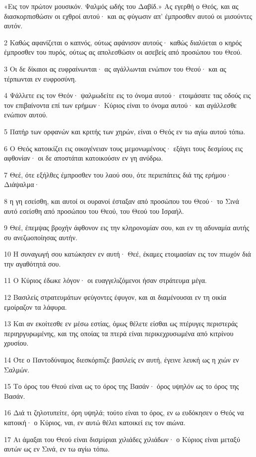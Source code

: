 \par «Εις τον πρώτον μουσικόν. Ψαλμός ωδής του Δαβίδ.» Ας εγερθή ο Θεός, και ας διασκορπισθώσιν οι εχθροί αυτού· και ας φύγωσιν απ' έμπροσθεν αυτού οι μισούντες αυτόν.
\par 2 Καθώς αφανίζεται ο καπνός, ούτως αφάνισον αυτούς· καθώς διαλύεται ο κηρός έμπροσθεν του πυρός, ούτως ας απολεσθώσιν οι ασεβείς από προσώπου του Θεού.
\par 3 Οι δε δίκαιοι ας ευφραίνωνται· ας αγάλλωνται ενώπιον του Θεού· και ας τέρπωνται εν ευφροσύνη.
\par 4 Ψάλλετε εις τον Θεόν· ψαλμωδείτε εις το όνομα αυτού· ετοιμάσατε τας οδούς εις τον επιβαίνοντα επί των ερήμων· Κύριος είναι το όνομα αυτού· και αγάλλεσθε ενώπιον αυτού.
\par 5 Πατήρ των ορφανών και κριτής των χηρών, είναι ο Θεός εν τω αγίω αυτού τόπω.
\par 6 Ο Θεός κατοικίζει εις οικογένειαν τους μεμονωμένους· εξάγει τους δεσμίους εις αφθονίαν· οι δε αποστάται κατοικούσιν εν γη ανύδρω.
\par 7 Θεέ, ότε εξήλθες έμπροσθεν του λαού σου, ότε περιεπάτεις διά της ερήμου· Διάψαλμα·
\par 8 η γη εσείσθη, και αυτοί οι ουρανοί έσταξαν από προσώπου του Θεού· το Σινά αυτό εσείσθη από προσώπου του Θεού, του Θεού του Ισραήλ.
\par 9 Θεέ, έπεμψας βροχήν άφθονον εις την κληρονομίαν σου, και εν τη αδυναμία αυτής συ ανεζωοποίησας αυτήν.
\par 10 Η συναγωγή σου κατώκησεν εν αυτή· Θεέ, έκαμες ετοιμασίαν εις τον πτωχόν διά την αγαθότητά σου.
\par 11 Ο Κύριος έδωκε λόγον· οι ευαγγελιζόμενοι ήσαν στράτευμα μέγα.
\par 12 Βασιλείς στρατευμάτων φεύγοντες έφυγον, και αι διαμένουσαι εν τη οικία εμοίραζον τα λάφυρα.
\par 13 Και αν εκοίτεσθε εν μέσω εστίας, όμως θέλετε είσθαι ως πτέρυγες περιστεράς περιηργυρωμένης, και της οποίας τα πτερά είναι περικεχρυσωμένα από κιτρίνου χρυσίου.
\par 14 Ότε ο Παντοδύναμος διεσκόρπιζε βασιλείς εν αυτή, έγεινε λευκή ως η χιών εν Σαλμών.
\par 15 Το όρος του Θεού είναι ως το όρος της Βασάν· όρος υψηλόν ως το όρος της Βασάν.
\par 16 Διά τι ζηλοτυπείτε, όρη υψηλά; τούτο είναι το όρος, εν ω ευδόκησεν ο Θεός να κατοική· ο Κύριος, ναι, εν αυτώ θέλει κατοικεί εις τον αιώνα.
\par 17 Αι άμαξαι του Θεού είναι δισμύριαι χιλιάδες χιλιάδων· ο Κύριος είναι μεταξύ αυτών ως εν Σινά, εν τω αγίω τόπω.
